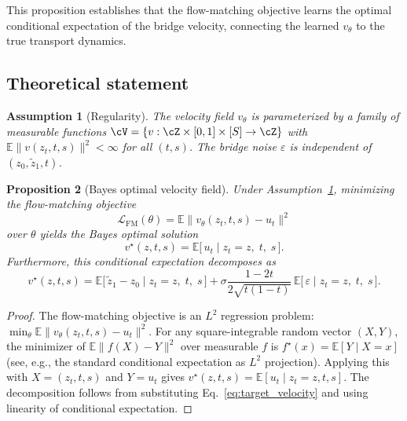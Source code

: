 \documentclass[letterpaper]{article}
\newtheorem{proposition}{Proposition}[section]
\newtheorem{assumption}[proposition]{Assumption}
\newcommand{\E}{\mathbb{E}}
\newcommand{\cL}{\mathcal{L}}
\begin{document}
This proposition establishes that the flow-matching objective learns the
optimal conditional expectation of the bridge velocity, connecting the
learned $v_\theta$ to the true transport dynamics.

\subsection{Theoretical statement}

\begin{assumption}[Regularity]
\label{asm:regularity}
The velocity field $v_\theta$ is parameterized by a family of measurable
functions $\cV = \{v : \cZ \times [0,1] \times [S] \to \cZ\}$ with
$\E\|v(z_t, t, s)\|^2 < \infty$ for all $(t,s)$. The bridge noise
$\varepsilon$ is independent of $(z_0, \tilde z_1, t)$.
\end{assumption}

\begin{proposition}[Bayes optimal velocity field]
\label{prop:bayes_optimal}
Under Assumption~\ref{asm:regularity}, minimizing the flow-matching objective
\begin{equation}
    \cL_{\mathrm{FM}}(\theta) = \E\bigl\| v_\theta(z_t, t, s) - u_t \bigr\|^2
\end{equation}
over $\theta$ yields the Bayes optimal solution
\begin{equation}
    v^\star(z, t, s) = \E\bigl[\, u_t \mid z_t = z,\; t,\; s \,\bigr].
    \label{eq:bayes_optimal}
\end{equation}
Furthermore, this conditional expectation decomposes as
\begin{equation}
    v^\star(z, t, s) = \E\bigl[\, \tilde z_1 - z_0 \mid z_t = z,\; t,\; s \,\bigr]
    + \sigma \frac{1-2t}{2\sqrt{t(1-t)}} \,
    \E\bigl[\, \varepsilon \mid z_t = z,\; t,\; s \,\bigr].
    \label{eq:bayes_decomp}
\end{equation}
\end{proposition}

\begin{proof}
The flow-matching objective is an $L^2$ regression problem:
$\min_\theta \E\|v_\theta(z_t, t, s) - u_t\|^2$.
For any square-integrable random vector $(X,Y)$, the minimizer of
$\E\|f(X) - Y\|^2$ over measurable $f$ is $f^\star(x) = \E[Y \mid X=x]$
(see, e.g., the standard conditional expectation as $L^2$ projection).
Applying this with $X = (z_t, t, s)$ and $Y = u_t$ gives
$v^\star(z, t, s) = \E[u_t \mid z_t = z, t, s]$.
The decomposition follows from substituting Eq.~\eqref{eq:target_velocity}
and using linearity of conditional expectation.
\end{proof}
\end{document}
